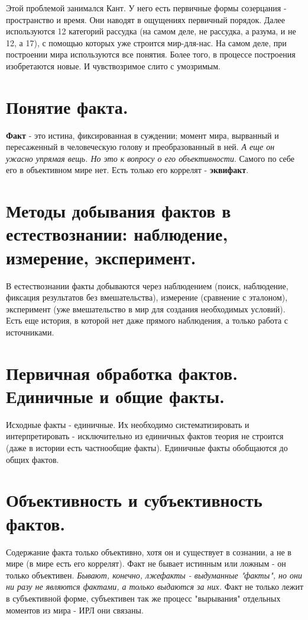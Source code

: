 Этой проблемой занимался Кант. У него есть первичные формы созерцания - пространство и время. Они наводят в ощущениях первичный порядок. Далее используются 12 категорий рассудка (на самом деле, не рассудка, а разума, и не 12, а 17), с помощью которых уже строится мир-для-нас. На самом деле, при построении мира используются все понятия. Более того, в процессе построения изобретаются новые. И чувствозримое слито с умозримым.

\section{ Понятие факта.}
\textbf{Факт} - это истина, фиксированная в суждении; момент мира, вырванный и пересаженный в человеческую голову и преобразованный в ней. \textit{А еще он ужасно упрямая вещь. Но это к вопросу о его объективности}. Самого по себе его в объективном мире нет. Есть только его коррелят - \textbf{эквифакт}.

\section{ Методы добывания фактов в естествознании: наблюдение, измерение, эксперимент.}
В естествознании факты добываются через наблюдением (поиск, наблюдение, фиксация результатов без вмешательства), измерение (сравнение с эталоном), эксперимент (уже вмешательство в мир для создания необходимых условий). Есть еще история, в которой нет даже прямого наблюдения, а только работа с источниками.

\section{ Первичная обработка фактов. Единичные и общие факты.}
Исходные факты - единичные. Их необходимо систематизировать и интерпретировать - исключительно из единичных фактов теория не строится (даже в истории есть частнообщие факты). Единичные факты обобщаются до общих фактов.

\section{ Объективность и субъективность фактов.}
Содержание факта только объективно, хотя он и существует в сознании, а не в мире (в мире есть его коррелят). Факт не бывает истинным или ложным - он только объективен. \textit{Бывают, конечно, лжефакты - выдуманные "факты", но они ни разу не являются фактами, а только выдаются за них.} Факт не только лежит в субъективной форме, субъективен так же процесс "вырывания" отдельных моментов из мира - ИРЛ они связаны.

